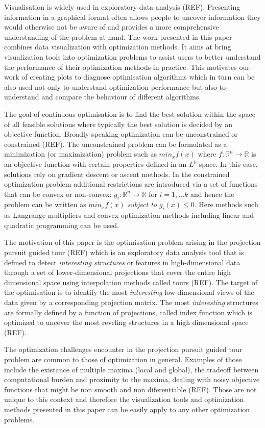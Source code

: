 \documentclass[12pt]{article}
\begin{document}
Visualisation is widely used in exploratory data analysis (REF). Presenting information in a graphical format often allows people to uncover information they would otherwise not be aware of and provides a more comprehensive understanding of the problem at hand. The work presented in this paper combines data visualization with optimization methods. It aims at bring visualization tools into optimization problems to assist users to better understand the performance of their optimization methods in practice. This motivates our work of creating plots to diagnose optimisation algorithms which in turn can be also used not only to understand optimization performance but also to understand and compare the behaviour of different algorithms.

The goal of continuous optimisation is to find the best solution within the space of all feasible solutions where typically the best solution is decided by an objective function. Broadly speaking optimization can be unconstrained or constrained (REF). The unconstrained problem can be formulated as a minimization (or maximization) problem such as
\(min_{x} f(x)\) where \(f:\mathbb{R}^n \rightarrow \mathbb{R}\) is an objective function with certain properties defined in an \(L^p\) space. In this case, solutions rely on gradient descent or ascent methods. In the constrained optimization problem additional restrictions are introduced via a set of functions that can be convex or non-convex: \(g_i:\mathbb{R}^n \rightarrow \mathbb{R}\) for \(i = 1, \ldots k\) and hence the problem can be written as
\(min_{x} f(x)\) \emph{subject to} \(g_i(x) \leq 0\). Here methods such as Langrange multipliers and convex optimization methods including linear and quadratic programming can be used.

The motivation of this paper is the optimisation problem arising in the projection pursuit guided tour (REF) which is an exploratory data analysis tool that is defined to detect \emph{interesting structures} or features in high-dimensional data through a set of lower-dimensional projections that cover the entire high dimensional space using interpolation methods called tours (REF). The target of the optimisation is to identify the most \emph{interesting} low-dimensional views of the data given by a corresponding projection matrix. The most \emph{interesting} structures are formally defined by a function of projections, called index function which is optimized to uncover the most reveling structures in a high dimensional space (REF).

The optimization challenges encounter in the projection pursuit guided tour problem are common to those of optimization in general. Examples of those include the existance of multiple maxima (local and global), the tradeoff between computational burden and proximity to the maxima, dealing with noisy objective functions that might be non smooth and non diferentiable (REF). Those are not unique to this context and therefore the visualization tools and optimization methods presented in this paper can be easily apply to any other optimization problems.
\end{document}
